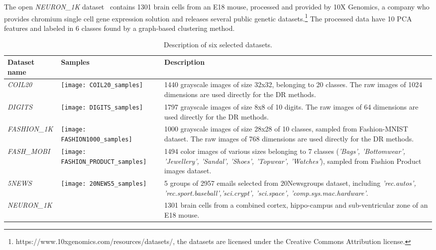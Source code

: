 The open \emph{NEURON\_1K} dataset~\cite{neuron1k} contains 1301 brain cells from an E18 mouse, processed and provided by 10X Genomics, a company who provides chromium single cell gene expression solution and releases several public genetic datasets.\footnote{https://www.10xgenomics.com/resources/datasets/, the datasets are licensed under the Creative Commons Attribution license.}
The processed data have 10 PCA features and labeled in 6 classes found by a graph-based clustering method.


\begin{table*}%
\caption{Description of six selected datasets.}\label{tbl:dataset}
\begin{tabular}{m{2.2cm} m{5.4cm} m{7.4cm}}
\toprule
Dataset name & Samples & Description \\
\midrule

\emph{COIL20}
    & \texttt{[image: COIL20\_samples]}
    & 1440 grayscale images of size 32x32, belonging to 20 classes.
    The raw images of 1024 dimensions are used directly for the DR methods.\\

\emph{DIGITS}
    & \texttt{[image: DIGITS\_samples]}
    & 1797 grayscale images of size 8x8 of 10 digits.
    The raw images of 64 dimensions are used directly for the DR methods.\\

\emph{FASHION\_1K}
    & \texttt{[image: FASHION1000\_samples]}
    & 1000 grayscale images of size 28x28 of 10 classes, sampled from Fashion-MNIST dataset.
    The raw images of 768 dimensions are used directly for the DR methods.\\

\emph{FASH\_MOBI}
    & \texttt{[image: FASHION\_PRODUCT\_samples]}
    & 1494 color images of various sizes belonging to 7 classes
    (\emph{'Bags', 'Bottomwear', 'Jewellery', 'Sandal', 'Shoes', 'Topwear', 'Watches'}),
    sampled from Fashion Product images dataset.\\

\emph{5NEWS}
    & \texttt{[image: 20NEWS5\_samples]}
    & 5 groups of 2957 emails selected from 20Newsgroups dataset,
    including \emph{'rec.autos', 'rec.sport.baseball','sci.crypt', 'sci.space', 'comp.sys.mac.hardware'}. \\

\emph{NEURON\_1K}
    &
    & 1301 brain cells from a combined cortex, hippo-campus and sub-ventricular zone of an E18 mouse. \\

\bottomrule
\end{tabular}
\end{table*}

